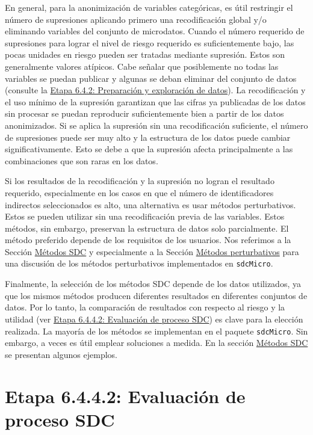 \documentclass[]{book}
\theoremstyle{definition}
\theoremstyle{definition}
\theoremstyle{definition}
\theoremstyle{definition}
\theoremstyle{remark}
\begin{document}
En general, para la anonimización de variables categóricas, es útil restringir el número de supresiones aplicando primero una recodificación global y/o eliminando variables del conjunto de microdatos. Cuando el número requerido de supresiones para lograr el nivel de riesgo requerido es suficientemente bajo, las pocas unidades en riesgo pueden ser tratadas mediante supresión. Estos son generalmente valores atípicos. Cabe señalar que posiblemente no todas las variables se puedan publicar y algunas se deban eliminar del conjunto de datos (consulte la \protect\hyperlink{etapa-6.4.2-preparaciuxf3n-y-exploraciuxf3n-de-datos}{Etapa 6.4.2: Preparación y exploración de datos}). La recodificación y el uso mínimo de la supresión garantizan que las cifras ya publicadas de los datos sin procesar se puedan reproducir suficientemente bien a partir de los datos anonimizados. Si se aplica la supresión sin una recodificación suficiente, el número de supresiones puede ser muy alto y la estructura de los datos puede cambiar significativamente. Esto se debe a que la supresión afecta principalmente a las combinaciones que son raras en los datos.

Si los resultados de la recodificación y la supresión no logran el resultado requerido, especialmente en los casos en que el número de identificadores indirectos seleccionados es alto, una alternativa es usar métodos perturbativos. Estos se pueden utilizar sin una recodificación previa de las variables. Estos métodos, sin embargo, preservan la estructura de datos solo parcialmente. El método preferido depende de los requisitos de los usuarios. Nos referimos a la Sección \protect\hyperlink{muxe9todos-sdc}{Métodos SDC} y especialmente a la Sección \protect\hyperlink{muxe9todos-perturbativos}{Métodos perturbativos} para una discusión de los métodos perturbativos implementados en \texttt{sdcMicro}.

Finalmente, la selección de los métodos SDC depende de los datos utilizados, ya que los mismos métodos producen diferentes resultados en diferentes conjuntos de datos. Por lo tanto, la comparación de resultados con respecto al riesgo y la utilidad (ver \protect\hyperlink{etapa-6.4.4.2-evaluaciuxf3n-de-proceso-sdc}{Etapa 6.4.4.2: Evaluación de proceso SDC}) es clave para la elección realizada. La mayoría de los métodos se implementan en el paquete \texttt{sdcMicro}. Sin embargo, a veces es útil emplear soluciones a medida. En la sección \protect\hyperlink{muxe9todos-sdc}{Métodos SDC} se presentan algunos ejemplos.

\hypertarget{etapa-6.4.4.2-evaluaciuxf3n-de-proceso-sdc}{%
\section{Etapa 6.4.4.2: Evaluación de proceso SDC}\label{etapa-6.4.4.2-evaluaciuxf3n-de-proceso-sdc}}
\end{document}
